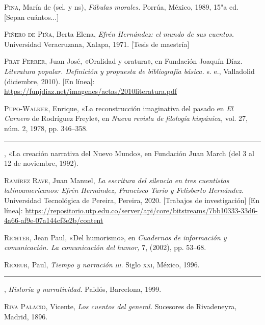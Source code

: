 \documentclass[14pt,twoside,final]{extbook} %
\begin{document}
\textsc{Pina}, María de (sel. y ns), \emph{Fábulas morales.} Porrúa, México, 1989, 15"a ed. [Sepan cuántos...]\label{bib:pina1989}

\textsc{Piñero de Piña}, Berta Elena, \emph{Efrén Hernández: el mundo de sus cuentos.} Universidad Veracruzana, Xalapa, 1971. [Tesis de maestría]\label{bib:piñero1971}

\textsc{Prat Ferrer}, Juan José, «Oralidad y oratura», en Fundación Joaquín Díaz. \emph{Literatura popular. Definición y propuesta de bibliografía básica.} s. e., Valladolid (diciembre, 2010). [En línea]: \url{https://funjdiaz.net/imagenes/actas/2010literatura.pdf}\label{bib:prat2010}

\textsc{Pupo-Walker}, Enrique, «La reconstrucción imaginativa del pasado en \emph{El Carnero} de Rodríguez Freyle», en \emph{Nueva revista de filología hispánica,} vol. 27, núm. 2, 1978, pp. 346--358.\label{bib:pupowalker1978}

\rule{1cm}{0.4pt}, «La creación narrativa del Nuevo Mundo», en Fundación Juan March (del 3 al 12 de noviembre, 1992).\label{bib:pupowalker1992}

\textsc{Ramírez Rave}, Juan Manuel, \emph{La escritura del silencio en tres cuentistas latinoamericanos: Efrén Hernández, Francisco Tario y Felisberto Hernández.} Universidad Tecnológica de Pereira, Pereira, 2020. [Trabajos de investigación] [En línea]: \url{https://repositorio.utp.edu.co/server/api/core/bitstreams/7bb10333-33d6-4a66-af9e-07a144cf3e2b/content} \label{bib:ramírez2020}

\textsc{Richter}, Jean Paul, «Del humorismo», en \emph{Cuadernos de información y comunicación. La comunicación del humor,} 7, (2002), pp. 53--68.\label{bib:richter2002}

\textsc{Ric\oe ur}, Paul, \emph{Tiempo y narración \textsc{iii}.} Siglo \textsc{xxi}, México, 1996.

\rule{1cm}{0.4pt}, \emph{Historia y narratividad.} Paidós, Barcelona, 1999.

\textsc{Riva Palacio}, Vicente, \emph{Los cuentos del general.} Sucesores de Rivadeneyra, Madrid, 1896.\label{bib:rivapalacio1896}
\end{document}

